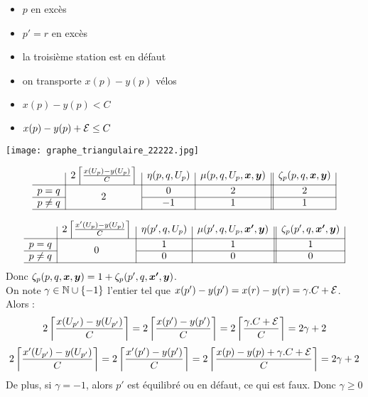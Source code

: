 \begin{minipage}{0.5\linewidth}
\begin{itemize}
\item $p$ en excès
\item $p'=r$ en excès
\item la troisième station est en défaut
\item on transporte $x(p)-y(p)$ vélos
\item $x(p)-y(p) < C$
\item $x(p) - y(p) + \mathcal{E} \le C$
\end{itemize}
\end{minipage}
\begin{minipage}{0.5\linewidth}
\begin{center}
\texttt{[image: graphe\_triangulaire\_22222.jpg]}
\end{center}
\end{minipage}

\begin{gather*}
  \begin{array}{c|c|c|c||c|}
    & 2 \left\lceil \frac{x(U_p)-y(U_p)}{C} \right\rceil
    & \eta(p,q,U_p)
    & \mu(p,q,U_p,\bs{x},\bs{y})
    & \zeta_p(p,q,\bs{x},\bs{y})
    \\ \hline
    p=q
    & \multirow{2}{*}{$2$}
    & 0
    & 2
    & 2
    \\ \cline{1-1}\cline{3-5}
    p \ne q
    &
    & -1
    & 1
    & 1
    \\ \hline
  \end{array}
\end{gather*}

\begin{gather*}
  \begin{array}{c|c|c|c||c|}
    & 2 \left\lceil \frac{x'(U_p)-y(U_p)}{C} \right\rceil
    & \eta(p',q,U_p)
    & \mu(p',q,U_p,\bs{x'},\bs{y})
    & \zeta_p(p',q,\bs{x'},\bs{y})
    \\ \hline
    p=q
    & \multirow{2}{*}{$0$}
    & 1
    & 1
    & 1
    \\ \cline{1-1}\cline{3-5}
    p \ne q
    &
    & 0
    & 0
    & 0
    \\ \hline
  \end{array}
\end{gather*}
Donc $\zeta_p(p,q,\boldsymbol{x},\boldsymbol{y}) = 1 + \zeta_p(p',q,\boldsymbol{x'},\boldsymbol{y})$.
\\

On note $\gamma \in \mathbb{N} \cup \{-1\}$ l'entier tel que $x(p')-y(p') = x(r)-y(r) = \gamma. C + \mathcal{E}$. Alors :
\[
2 \left\lceil \frac{x(U_{p'})-y(U_{p'})}{C} \right\rceil
= 2 \left\lceil \frac{x(p')-y(p')}{C} \right\rceil
= 2 \left\lceil \frac{\gamma. C + \mathcal{E}}{C} \right\rceil
= 2\gamma + 2
\]
\[
2 \left\lceil \frac{x'(U_{p'})-y(U_{p'})}{C} \right\rceil
= 2 \left\lceil \frac{x'(p')-y(p')}{C} \right\rceil
= 2 \left\lceil \frac{x(p)-y(p)+\gamma. C + \mathcal{E}}{C} \right\rceil
= 2\gamma + 2
\]
De plus, si $\gamma = -1$, alors $p'$ est équilibré ou en défaut, ce qui est faux. Donc $\gamma \ge 0$

